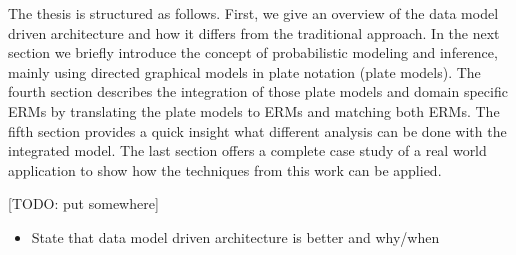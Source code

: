 The thesis is structured as follows. First, we give an overview of the data model driven architecture and how it differs from the traditional approach. In the next section we briefly introduce the concept of probabilistic modeling and inference, mainly using directed graphical models in plate notation (plate models). The fourth section describes the integration of those plate models and domain specific ERMs by translating the plate models to ERMs and matching both ERMs. The fifth section provides a quick insight what different analysis can be done with the integrated model. The last section offers a complete case study of a real world application to show how the techniques from this work can be applied.

[TODO: put somewhere]
\begin{itemize}
\item State that data model driven architecture is better and why/when
\end{itemize}
